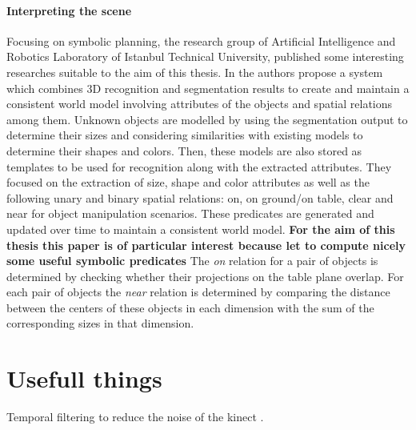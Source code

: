 \paragraph{Interpreting the scene}
Focusing on symbolic planning, the research group of Artificial Intelligence and Robotics Laboratory of
Istanbul Technical University, published some interesting researches suitable to the aim of this thesis. In \citep{ersen2014scene} \citep{SSS147762} \citep{ersen2013extracting} the authors propose a system which combines 3D recognition and segmentation results to create and maintain a consistent world model involving attributes of the objects and spatial relations among them. Unknown objects are modelled by using the segmentation output to determine their sizes and considering similarities with existing models to determine their shapes and colors. Then, these models are also stored as templates to be used for recognition along with the extracted attributes. 
They focused on the extraction of size, shape and color attributes as well as the following unary and binary spatial relations: on, on ground/on table, clear and near for object manipulation scenarios. These predicates are generated and updated over time to maintain a consistent world model.
\textbf{For the aim of this thesis this paper is of particular interest because let to compute nicely some useful symbolic predicates}
The \textit{on} relation for a pair of objects is determined by checking whether their projections on the table plane overlap. For each pair of objects the \textit{near} relation is determined by comparing the distance between the centers of these objects in each dimension with the sum of the corresponding sizes in that dimension. 



\section{Usefull things}
Temporal filtering to reduce the noise of the kinect	 \citep{SSS147762}.

